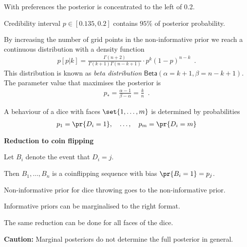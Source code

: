\documentclass[landscape,footrule]{foils}
\begin{document}
\vspace*{-0.5cm}

\begin{triangles}
\item With preferences the posterior is concentrated to the left of 0.2.
\item Credibility interval $p\in[0.135,0.2]$ contains $95\%$ of posterior probability.
\end{triangles}


By increasing the number of grid points in the non-informative prior we reach a continuous distribution with a density function
\begin{align*}  
p[p|k] = \frac{\Gamma(n+2)}{\Gamma(k+1)\Gamma(n-k+1)}\cdot p^k(1-p)^{n-k}\enspace.
\end{align*}
This distribution is known as \emph{beta distribution} $\mathsf{Beta}(\alpha=k+1, \beta=n-k+1)$.
The parameter value that maximises the posterior is 
\begin{align*}
p_* =\frac{\alpha-1}{\beta-\alpha}=\frac{k}{n}\enspace.
\end{align*} 


A behaviour of a dice with faces $\set{1,\ldots,m}$ is determined by probabilities 
\begin{align*}
p_1=\pr{D_i=1},\quad\ldots,\quad p_m=\pr{D_i=m}
\end{align*}

\textbf{Reduction to coin flipping} 
\begin{triangles}
\item Let $B_i$ denote the event that $D_i=j$.
\item Then $B_1,\ldots, B_n$ is a coinflipping sequence with bias $\pr{B_i=1}=p_j$.
\item Non-informative prior for dice throwing goes to the non-informative prior.
\item Informative priors can be marginalised to the right format.
\item The same reduction can be done for all faces of the dice.    
\end{triangles} 
\vspace*{1cm}

\textbf{Caution:} Marginal posteriors do not determine the full posterior in general.
\end{document}
